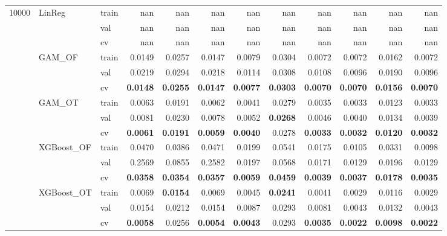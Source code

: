 \begin{tabular}{lllrrrrrrrrr}
\multirow[c]{15}{*}{10000} & \multirow[c]{3}{*}{LinReg} & train & nan & nan & nan & nan & nan & nan & nan & nan & nan \\
 &  & val & nan & nan & nan & nan & nan & nan & nan & nan & nan \\
 &  & cv & nan & nan & nan & nan & nan & nan & nan & nan & nan \\
 & \multirow[c]{3}{*}{GAM_OF} & train & 0.0149 & 0.0257 & 0.0147 & 0.0079 & 0.0304 & 0.0072 & 0.0072 & 0.0162 & 0.0072 \\
 &  & val & 0.0219 & 0.0294 & 0.0218 & 0.0114 & 0.0308 & 0.0108 & 0.0096 & 0.0190 & 0.0096 \\
 &  & cv & \bfseries 0.0148 & \bfseries 0.0255 & \bfseries 0.0147 & \bfseries 0.0077 & \bfseries 0.0303 & \bfseries 0.0070 & \bfseries 0.0070 & \bfseries 0.0156 & \bfseries 0.0070 \\
 & \multirow[c]{3}{*}{GAM_OT} & train & 0.0063 & 0.0191 & 0.0062 & 0.0041 & 0.0279 & 0.0035 & 0.0033 & 0.0123 & 0.0033 \\
 &  & val & 0.0081 & 0.0230 & 0.0078 & 0.0052 & \bfseries 0.0268 & 0.0046 & 0.0040 & 0.0134 & 0.0039 \\
 &  & cv & \bfseries 0.0061 & \bfseries 0.0191 & \bfseries 0.0059 & \bfseries 0.0040 & 0.0278 & \bfseries 0.0033 & \bfseries 0.0032 & \bfseries 0.0120 & \bfseries 0.0032 \\
 & \multirow[c]{3}{*}{XGBoost_OF} & train & 0.0470 & 0.0386 & 0.0471 & 0.0199 & 0.0541 & 0.0175 & 0.0105 & 0.0331 & 0.0098 \\
 &  & val & 0.2569 & 0.0855 & 0.2582 & 0.0197 & 0.0568 & 0.0171 & 0.0129 & 0.0196 & 0.0129 \\
 &  & cv & \bfseries 0.0358 & \bfseries 0.0354 & \bfseries 0.0357 & \bfseries 0.0059 & \bfseries 0.0459 & \bfseries 0.0039 & \bfseries 0.0037 & \bfseries 0.0178 & \bfseries 0.0035 \\
 & \multirow[c]{3}{*}{XGBoost_OT} & train & 0.0069 & \bfseries 0.0154 & 0.0069 & 0.0045 & \bfseries 0.0241 & 0.0041 & 0.0029 & 0.0116 & 0.0029 \\
 &  & val & 0.0154 & 0.0212 & 0.0154 & 0.0087 & 0.0293 & 0.0081 & 0.0043 & 0.0132 & 0.0043 \\
 &  & cv & \bfseries 0.0058 & 0.0256 & \bfseries 0.0054 & \bfseries 0.0043 & 0.0293 & \bfseries 0.0035 & \bfseries 0.0022 & \bfseries 0.0098 & \bfseries 0.0022 \\
\end{tabular}
